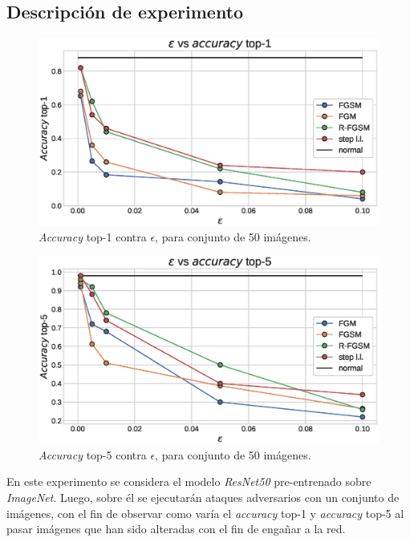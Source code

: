 \documentclass[conference]{IEEEtran}
\begin{document}
\subsection{Descripción de experimento}
\begin{figure}[!t]
    \centering
    \includegraphics[width=\linewidth]{accuracy_top1.eps}
       \caption{\textit{Accuracy} top-1 contra $\epsilon$, para conjunto de 50 imágenes.}
    \label{fig:accuracytop1}
\end{figure}
\begin{figure}[!t]
    \centering
    \includegraphics[width=\linewidth]{accuracy_top5.eps}
    \caption{\textit{Accuracy} top-5 contra $\epsilon$, para conjunto de 50 imágenes.}
    \label{fig:accuracytop5}
\end{figure}
En este experimento se considera el modelo \textit{ResNet50} pre-entrenado sobre \textit{ImageNet}. Luego, sobre él se ejecutarán ataques adversarios con un conjunto de imágenes, con el fin de observar como varía el \textit{accuracy} top-1 y \textit{accuracy} top-5 al pasar imágenes que han sido alteradas con el fin de engañar a la red. 
\end{document}
